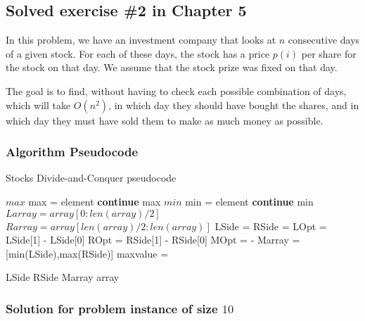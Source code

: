 \documentclass{article}
\begin{document}
\subsection*{Solved exercise \#2 in Chapter 5}

In this problem, we have an investment company that looks at $n$ consecutive days of a given stock. For each of these days, the stock has a price $p(i)$ per share for the stock on that day. We assume that the stock prize was fixed on that day.

The goal is to find, without having to check each possible combination of days, which will take $O(n^2)$, in which day they should have bought the shares, and in which day they must have sold them to make as much money as possible.

\subsubsection*{Algorithm Pseudocode}

\begin{algorithm}[H]
\caption{Stocks Divide-and-Conquer pseudocode}
\begin{algorithmic}[1]
 \State $max$
   \State max = element
  \Else{}
   \State \textbf{continue}
  \EndIf
 \EndFor
 \State \Return max
\EndFunction
\State
{}
 \State $min$
   \State min = element
  \Else{}
   \State \textbf{continue}
  \EndIf
 \EndFor
 \State \Return min
\EndFunction
\State
{}
 \State $Larray = array[0:len(array)/2]$
 \State $Rarray = array[len(array)/2:len(array)]$
 \State
 \State LSide = 
 \State RSide = 
 \State
 \State LOpt = LSide[1] - LSide[0]
 \State ROpt = RSide[1] - RSide[0]
 \State MOpt =  - 
 \State
 \State Marray = [min(LSide),max(RSide)]
 \State
 \State maxvalue = 

  \State \Return LSide
  \State \Return RSide
  \State \Return Marray
 \EndIf
 \State
{}
 \State \Return array
\EndIf
\EndFunction
\end{algorithmic}
\end{algorithm}

\subsubsection*{Solution for problem instance of size $10$}
\end{document}
